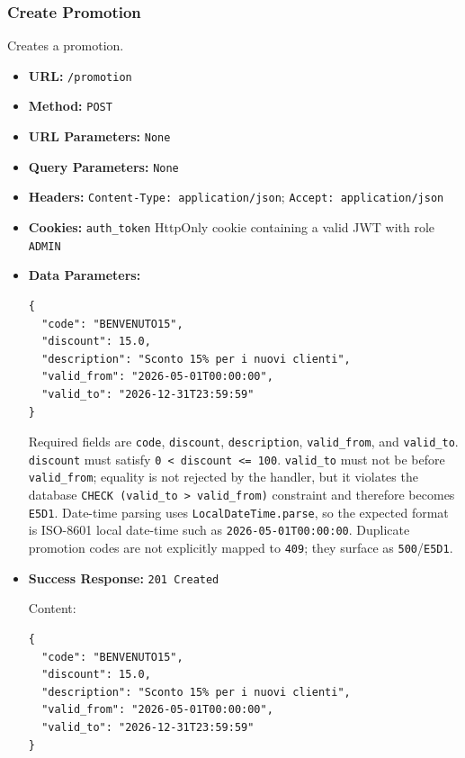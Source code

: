 \subsubsection*{Create Promotion}

Creates a promotion.

\begin{itemize}[nosep]
\item \textbf{URL:} \texttt{/promotion}

\item \textbf{Method:} \texttt{POST}

\item \textbf{URL Parameters:} \texttt{None}

\item \textbf{Query Parameters:} \texttt{None}

\item \textbf{Headers:} \texttt{Content-Type: application/json}; \texttt{Accept: application/json}

\item \textbf{Cookies:} \texttt{auth\_token} HttpOnly cookie containing a valid JWT with role \texttt{ADMIN}

\item \textbf{Data Parameters:}

\begin{lstlisting}
{
  "code": "BENVENUTO15",
  "discount": 15.0,
  "description": "Sconto 15% per i nuovi clienti",
  "valid_from": "2026-05-01T00:00:00",
  "valid_to": "2026-12-31T23:59:59"
}
\end{lstlisting}

Required fields are \texttt{code}, \texttt{discount}, \texttt{description}, \texttt{valid\_from}, and \texttt{valid\_to}. \texttt{discount} must satisfy \texttt{0 < discount <= 100}. \texttt{valid\_to} must not be before \texttt{valid\_from}; equality is not rejected by the handler, but it violates the database \texttt{CHECK (valid\_to > valid\_from)} constraint and therefore becomes \texttt{E5D1}. Date-time parsing uses \texttt{LocalDateTime.parse}, so the expected format is ISO-8601 local date-time such as \texttt{2026-05-01T00:00:00}. Duplicate promotion codes are not explicitly mapped to \texttt{409}; they surface as \texttt{500}/\texttt{E5D1}.

\item \textbf{Success Response:} \texttt{201 Created}

Content:

\begin{lstlisting}
{
  "code": "BENVENUTO15",
  "discount": 15.0,
  "description": "Sconto 15% per i nuovi clienti",
  "valid_from": "2026-05-01T00:00:00",
  "valid_to": "2026-12-31T23:59:59"
}
\end{lstlisting}


\end{itemize}
